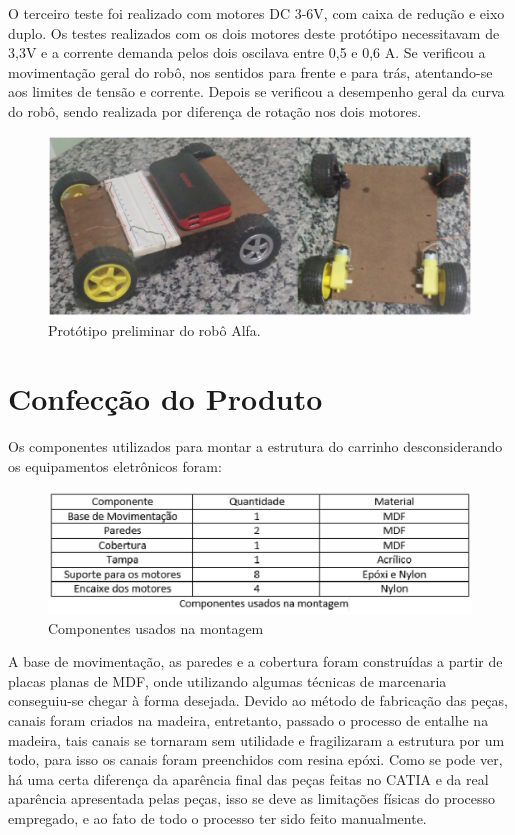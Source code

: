 O terceiro teste foi realizado com motores DC 3-6V, com caixa de redução e eixo duplo. Os testes realizados com os dois motores deste
protótipo necessitavam de 3,3V e a corrente demanda pelos dois oscilava entre 0,5 e 0,6 A. Se verificou a movimentação geral do robô,
nos sentidos para frente e para trás, atentando-se aos limites de tensão e corrente. Depois se verificou a desempenho geral da curva do
robô, sendo realizada por diferença de rotação nos dois motores.

\begin{figure}[H]
    \centering
    \includegraphics[width=1\textwidth]{figuras/prototipo_01.eps}
    \caption{Protótipo preliminar do robô Alfa.}
    \label{fig:prototipo_01}
\end{figure}

\section{Confecção do Produto}

Os componentes utilizados para montar a estrutura do carrinho desconsiderando os equipamentos eletrônicos foram:

\begin{figure}[H]
    \centering
    \includegraphics[width=1\textwidth]{figuras/usados.eps}
    \caption{Componentes usados na montagem}
    \label{fig:usados}
\end{figure}

A base de movimentação, as paredes e a cobertura foram construídas a partir de placas planas de MDF, onde utilizando algumas técnicas
de marcenaria conseguiu-se chegar à forma desejada. Devido ao método de fabricação das peças, canais foram criados na madeira, entretanto,
passado o processo de entalhe na madeira, tais canais se tornaram sem utilidade e fragilizaram a estrutura por um todo, para isso os canais
foram preenchidos com resina epóxi. Como se pode ver, há uma certa diferença da aparência final das peças feitas no CATIA e da real aparência
apresentada pelas peças, isso se deve as limitações físicas do processo empregado, e ao fato de todo o processo ter sido feito manualmente.


